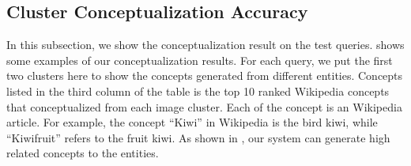\subsection{Cluster Conceptualization Accuracy}
In this subsection, we show the conceptualization result on the test
queries.  shows some examples of our conceptualization
results. For each query, we put the first two clusters here to show the concepts
generated from different entities.
Concepts listed in the third column of the table is the top
10 ranked Wikipedia concepts that conceptualized from each image cluster.
Each of the concept is an Wikipedia article. For example, the concept ``Kiwi''
in Wikipedia is the bird kiwi, while ``Kiwifruit'' refers to the fruit kiwi.
As shown in , our system can generate high related concepts
to the entities.

